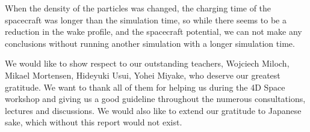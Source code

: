 \documentclass[aip, 
rsi, 
amsmath,
amssymb,
longbibliography,
reprint]{revtex4-1}
\begin{document}
When the density of the particles was changed, the charging time of the spacecraft was longer than the simulation time, so while there seems to be a reduction in the wake profile, and the spacecraft potential, we can not make any conclusions without running another simulation with a longer simulation time. \\

\begin{acknowledgments}
We would like to show respect to our outstanding teachers, Wojciech Miloch, Mikael Mortensen, Hideyuki Usui, Yohei Miyake, who deserve our greatest gratitude. We want to thank all of them for helping us during the 4D Space workshop and giving us a good guideline throughout the numerous consultations, lectures and discussions. We would also like to extend our gratitude to Japanese sake, which without this report would not exist.
\end{acknowledgments}


\end{document}
